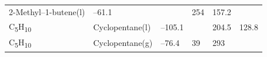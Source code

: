 \documentclass[
]{book}
\theoremstyle{definition}
\theoremstyle{definition}
\theoremstyle{definition}
\theoremstyle{remark}
\begin{document}
\begin{longtable}[]{@{}llllll@{}}
\begin{minipage}[t]{0.17\columnwidth}
2-Methyl--1-butene(l)\strut
\end{minipage} & \begin{minipage}[t]{0.15\columnwidth}\raggedright
--61.1\strut
\end{minipage} & \begin{minipage}[t]{0.15\columnwidth}\raggedright
\strut
\end{minipage} & \begin{minipage}[t]{0.14\columnwidth}\raggedright
254\strut
\end{minipage} & \begin{minipage}[t]{0.14\columnwidth}\raggedright
157.2\strut
\end{minipage}\tabularnewline
\begin{minipage}[t]{0.07\columnwidth}\raggedright
C\textsubscript{5}H\textsubscript{10}\strut
\end{minipage} & \begin{minipage}[t]{0.17\columnwidth}\raggedright
Cyclopentane(l)\strut
\end{minipage} & \begin{minipage}[t]{0.15\columnwidth}\raggedright
--105.1\strut
\end{minipage} & \begin{minipage}[t]{0.15\columnwidth}\raggedright
\strut
\end{minipage} & \begin{minipage}[t]{0.14\columnwidth}\raggedright
204.5\strut
\end{minipage} & \begin{minipage}[t]{0.14\columnwidth}\raggedright
128.8\strut
\end{minipage}\tabularnewline
\begin{minipage}[t]{0.07\columnwidth}\raggedright
C\textsubscript{5}H\textsubscript{10}\strut
\end{minipage} & \begin{minipage}[t]{0.17\columnwidth}\raggedright
Cyclopentane(g)\strut
\end{minipage} & \begin{minipage}[t]{0.15\columnwidth}\raggedright
--76.4\strut
\end{minipage} & \begin{minipage}[t]{0.15\columnwidth}\raggedright
39\strut
\end{minipage} & \begin{minipage}[t]{0.14\columnwidth}\raggedright
293\strut
\end{minipage} & \begin{minipage}[t]{0.14\columnwidth}\raggedright

\end{minipage}
\end{longtable}
\end{document}
